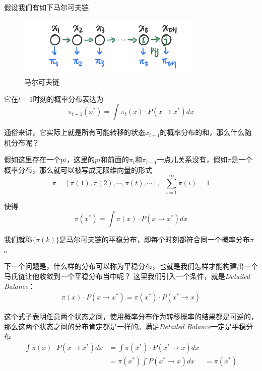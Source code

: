 假设我们有如下马尔可夫链

\begin{figure}[H]
    \centering
    \includegraphics[scale=0.6]{figures/马尔可夫链.png}
    \caption{马尔可夫链}
\end{figure}

它在$t+1$时刻的概率分布表达为
\begin{equation}
    \pi_{t+1}(x^*)=\int \pi_t(x)\cdot P(x\rightarrow x^*)dx
\end{equation}

通俗来讲，它实际上就是所有可能转移的状态$x_{t+1}$的概率分布的和，那么什么随机分布呢？

假如这里存在一个$pi$，这里的$pi$和前面的$\pi_t$和$\pi_{t+1}$一点儿关系没有，假如$\pi$是一个概率分布，那么就可以被写成无限维向量的形式
\begin{equation}
    \pi=[\pi(1),\pi(2),\cdots,\pi(t),\cdots], \ \ \ \sum_{i=1}^{\infty}\pi(i)=1
\end{equation}

使得
\begin{equation}
    \pi(x^*)=\int \pi(x)\cdot P(x\rightarrow x^*)dx
\end{equation}

我们就称$\{\pi(k)\}$是马尔可夫链的平稳分布，即每个时刻都符合同一个概率分布$\pi$。

下一个问题是，什么样的分布可以称为平稳分布，也就是我们怎样才能构建出一个马氏链让他收敛到一个平稳分布当中呢？
这里我们引入一个条件，就是\textsl{Detailed Balance}：
\begin{eqnarray}
    \pi(x)\cdot P(x\rightarrow x^*)=\pi(x^*)\cdot P(x^*\rightarrow x)
\end{eqnarray}

这个式子表明任意两个状态之间，使用概率分布作为转移概率的结果都是可逆的，那么这两个状态之间的分布肯定都是一样的。满足\textsl{Detailed Balance}一定是平稳分布
\begin{equation}
    \begin{aligned}
        \int \pi(x)\cdot P(x\rightarrow x^*)dx&=\int \pi(x^*)\cdot P(x^*\rightarrow x)dx\\
        &=\pi(x^*)\int P(x^*\rightarrow x)dx
        &=    \pi(x^*)
    \end{aligned}
\end{equation}

